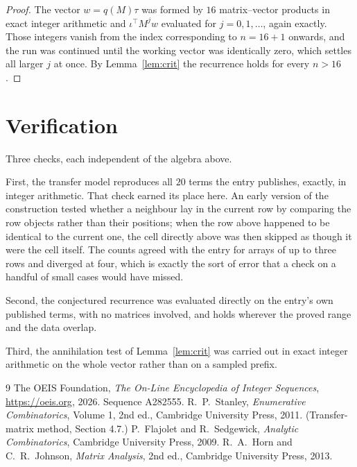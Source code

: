 \documentclass[11pt,a4paper]{article}
\theoremstyle{plain}
\theoremstyle{definition}
\begin{document}
\begin{proof}
The vector $w=q(M)\tau$ was formed by $16$ matrix--vector products in exact integer
arithmetic and $\iota^{\!\top}M^{j}w$ evaluated for $j=0,1,\dots$, again exactly. Those
integers vanish from the index corresponding to $n=16+1$ onwards, and the run was
continued until the working vector was identically zero, which settles all larger $j$ at once.
By Lemma~\ref{lem:crit} the recurrence holds for every $n>16$.
\end{proof}

\section{Verification}

Three checks, each independent of the algebra above.

First, the transfer model reproduces all $20$ terms the entry publishes, exactly, in
integer arithmetic. That check earned its place here. An early version of the construction
tested whether a neighbour lay in the current row by comparing the row objects rather
than their positions; when the row above happened to be identical to the current one, the
cell directly above was then skipped as though it were the cell itself. The counts agreed with
the entry for arrays of up to three rows and diverged at four, which is exactly the sort of
error that a check on a handful of small cases would have missed.

Second, the conjectured recurrence was evaluated directly on the entry's own published terms,
with no matrices involved, and holds wherever the proved range and the data overlap.

Third, the annihilation test of Lemma~\ref{lem:crit} was carried out in exact integer
arithmetic on the whole vector rather than on a sampled prefix.

\begin{thebibliography}{9}
 The OEIS Foundation, \emph{The On-Line Encyclopedia of Integer
Sequences}, \url{https://oeis.org}, 2026. Sequence A282555.
 R.~P.~Stanley, \emph{Enumerative Combinatorics}, Volume 1, 2nd ed.,
Cambridge University Press, 2011. (Transfer-matrix method, Section 4.7.)
 P.~Flajolet and R.~Sedgewick, \emph{Analytic Combinatorics}, Cambridge
University Press, 2009.
 R.~A.~Horn and C.~R.~Johnson, \emph{Matrix Analysis}, 2nd ed., Cambridge
University Press, 2013.
\end{thebibliography}
\end{document}
